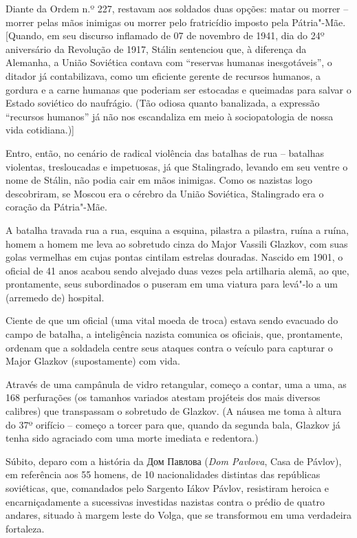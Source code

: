 Diante da Ordem n.º 227, restavam aos soldados duas opções: matar ou
morrer -- morrer pelas mãos inimigas ou morrer pelo fratricídio imposto
pela Pátria"-Mãe. {[}Quando, em seu discurso inflamado de 07 de novembro
de 1941, dia do 24º aniversário da Revolução de 1917, Stálin sentenciou
que, à diferença da Alemanha, a União Soviética contava com ``reservas
humanas inesgotáveis'', o ditador já contabilizava, como um eficiente
gerente de recursos humanos, a gordura e a carne humanas que poderiam
ser estocadas e queimadas para salvar o Estado soviético do
naufrágio. (Tão odiosa quanto banalizada, a expressão ``recursos humanos'' já não
nos escandaliza em meio à sociopatologia de nossa vida cotidiana.){]}



Entro, então, no cenário de radical violência das batalhas de rua --
batalhas violentas, tresloucadas e impetuosas, já que Stalingrado,
levando em seu ventre o nome de Stálin, não podia cair em mãos inimigas.
Como os nazistas logo descobriram, se Moscou era o cérebro da União
Soviética, Stalingrado era o coração da Pátria"-Mãe.

A batalha travada rua a rua, esquina a esquina, pilastra a pilastra,
ruína a ruína, homem a homem me leva ao sobretudo cinza do Major Vassili
Glazkov, com suas golas vermelhas em cujas pontas cintilam estrelas
douradas. Nascido em 1901, o oficial de 41 anos acabou sendo alvejado
duas vezes pela artilharia alemã, ao que, prontamente, seus subordinados
o puseram em uma viatura para levá"-lo a um (arremedo de) hospital.

Ciente de que um oficial (uma vital moeda de troca) estava sendo
evacuado do campo de batalha, a inteligência nazista comunica os
oficiais, que, prontamente, ordenam que a soldadela centre seus ataques
contra o veículo para capturar o Major Glazkov (supostamente) com vida.

Através de uma campânula de vidro retangular, começo a contar, uma a
uma, as 168 perfurações (os tamanhos variados atestam projéteis dos mais
diversos calibres) que transpassam o sobretudo de Glazkov. (A náusea me
toma à altura do 37º orifício -- começo a torcer para que, quando da
segunda bala, Glazkov já tenha sido agraciado com uma morte imediata e
redentora.)

Súbito, deparo com a história da Дом Павлова 
(\emph{Dom Pavlova}, Casa de Pávlov), em referência aos 55
homens, de 10 nacionalidades distintas das repúblicas soviéticas, que,
comandados pelo Sargento Iákov Pávlov, resistiram heroica e
encarniçadamente a sucessivas investidas nazistas contra o prédio de
quatro andares, situado à margem leste do Volga, que se transformou em
uma verdadeira fortaleza.

